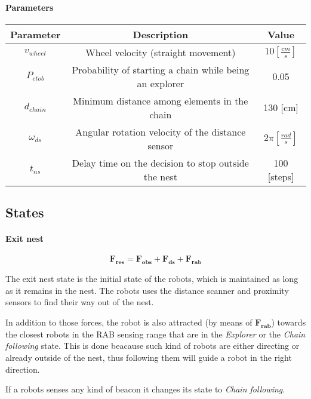 \paragraph{Parameters}
\begin{center}
\begin{tabular}{|c|c|c|}
\hline
\textbf{Parameter} & \textbf{Description} & \textbf{Value} \\ \hline
$v_{wheel}$ & Wheel velocity (straight movement) & $10 [\frac{cm}{s}]$ \\ \hline
$P_{etob}$ & Probability of starting a chain while being an explorer & 0.05 \\ \hline
$d_{chain}$ & Minimum distance among elements in the chain  & 130 [cm] \\ \hline
$\omega_{ds}$ & Angular rotation velocity of the distance sensor & $2\pi [\frac{rad}{s}]$ \\ \hline
$t_{ns}$ & Delay time on the decision to stop outside the nest & 100 [steps] \\ \hline
\end{tabular}
\label{tab:parameters}
\end{center}

\subsection{States} \label{subsec:states}
\paragraph{Exit nest} \label{par:exitnest}
\begin{equation}
  \mathbf{F_{res}} = \mathbf{F_{obs}} + \mathbf{F_{ds}} + \mathbf{F_{rab}}
\end{equation}

The exit nest state is the initial state of the robots, which is maintained as long as it remains in the nest.
The robots uses the distance scanner and proximity sensors to find their way out 
of the nest.

In addition to those forces, the robot is also attracted (by means of $\mathbf{F_{rab}}$) 
towards the closest robots in the RAB sensing range that are in the \emph{Explorer} 
or the \emph{Chain following} state.
This is done beacause such kind of robots are either directing or already 
outside of the nest, thus following them will guide a robot in the right 
direction.

If a robots senses any kind of beacon it changes its state to \emph{Chain following}.

